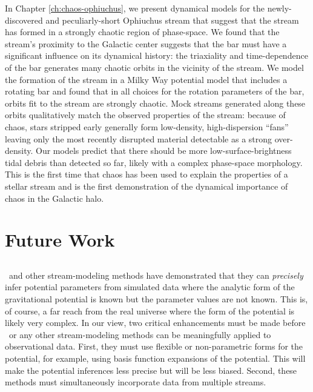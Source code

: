 In Chapter \ref{ch:chaos-ophiuchus}, we present dynamical models for the newly-discovered and peculiarly-short Ophiuchus stream that suggest that the stream has formed in a strongly chaotic region of phase-space. We found that the stream's proximity to the Galactic center suggests that the bar must have a significant influence on its dynamical history: the triaxiality and time-dependence of the bar generates many chaotic orbits in the vicinity of the stream. We model the formation of the stream in a Milky Way potential model that includes a rotating bar and found that in all choices for the rotation parameters of the bar, orbits fit to the stream are strongly chaotic. Mock streams generated along these orbits qualitatively match the observed properties of the stream: because of chaos, stars stripped early generally form low-density, high-dispersion ``fans'' leaving only the most recently disrupted material detectable as a strong over-density. Our models predict that there should be more low-surface-brightness tidal debris than detected so far, likely with a complex phase-space morphology. This is the first time that chaos has been used to explain the properties of a stellar stream and is the first demonstration of the dynamical importance of chaos in the Galactic halo.

\section{Future Work} \label{sec:future-work}

\subsection{\rewinder}

\rewinder\ and other stream-modeling methods have demonstrated that they can \emph{precisely} infer potential parameters from simulated data where the analytic form of the gravitational potential is known but the parameter values are not known. This is, of course, a far reach from the real universe where the form of the potential is likely very complex. In our view, two critical enhancements must be made before \rewinder\ or any other stream-modeling methods can be meaningfully applied to observational data. First, they must use flexible or non-parametric forms for the potential, for example, using basis function expansions of the potential. This will make the potential inferences less precise but will be less biased. Second, these methods must simultaneously incorporate data from multiple streams.

